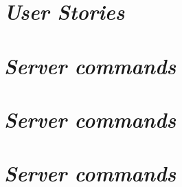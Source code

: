 \begin{appendix}

\chapter{\textit{User Stories}}

\chapter{\textit{Server commands}}

\chapter{\textit{Server commands}}

\chapter{\textit{Server commands}}

\end{appendix}